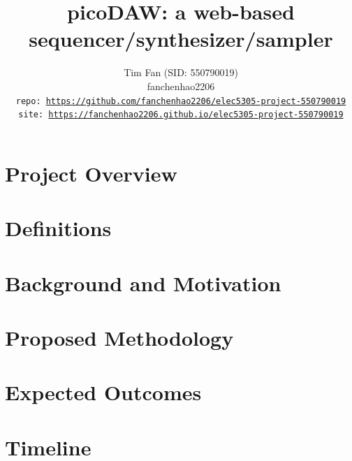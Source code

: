 \documentclass[journal]{IEEEtran}
\title{picoDAW: a web-based sequencer/synthesizer/sampler}
\author{
	Tim Fan (SID: 550790019) \\
	fanchenhao2206 \\
	\texttt{repo: \url{https://github.com/fanchenhao2206/elec5305-project-550790019}}\\
	\texttt{site: \url{https://fanchenhao2206.github.io/elec5305-project-550790019}}
}
\begin{document}
\maketitle

\section{Project Overview}



\section{Definitions}



\section{Background and Motivation}



\section{Proposed Methodology}



\section{Expected Outcomes}



\section{Timeline}





\end{document}
